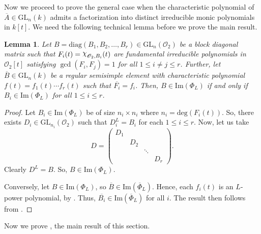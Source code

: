 \documentclass[11pt,twoside]{amsart}
\newcommand{\GL}{\mathrm{GL}}
\newcommand{\im}{\mathrm{Im}}
\newcommand{\upchi}{\raisebox{0.4ex}{$\chi$}}
\newcommand{\Char}{\upchi}
\newcommand{\R}{\mathscr{O}_2}
\newtheorem{lemma}{Lemma}[section]
\theoremstyle{definition} %
\begin{document}
Now we proceed to prove the general case when the characteristic polynomial of $\overline{A}\in \GL_n(k)$ admits a factorization into distinct irreducible monic polynomials in $k[t]$. We need the following technical lemma before we prove the main result.  
\begin{lemma}\label{lem:tech-2-thm-1}
Let $B= \mathrm{diag}(B_1, B_2, \ldots, B_r)\in \GL_n(\R)$ be a block diagonal matrix such that $F_i(t) = \Char_{\R, B_i}(t)$ are fundamental irreducible polynomials in $\R[t]$ satisfying $\gcd(F_i, F_j)=1$ for all $1\leq i\neq j\leq r$. Further, let $\overline{B} \in\GL_n(k)$ be a regular semisimple element with characteristic polynomial $f(t) = {f}_1(t)\cdots {f}_r(t)$ such that $\overline{F_i}= f_i$.
Then, $B\in \im(\Phi_L)$ if and only if $B_i\in \im(\Phi_L)$ for all $1\leq i\leq r$.
\end{lemma}
\begin{proof}
Let $B_i\in \im(\Phi_L)$ be of size $n_i\times n_i$ where $n_i = \mathrm{deg}(F_i(t))$. So, there exists $D_i\in \GL_{n_i}(\R)$ such that $D_i^L = B_i$ for each $1\leq i\leq r$. Now, let us take 
$$ D = \begin{pmatrix}  %
D_1 & & & \\& D_2 & & \\ & & \ddots & \\ & & & D_r
\end{pmatrix}.$$
Clearly $D^L = B$. So, $B\in \im(\Phi_L)$.

Conversely, let $B\in \im(\Phi_L)$, so $\overline{B} \in \im(\overline{\Phi}_L)$. Hence, each $f_i(t)$ is an $L$-power polynomial, by \cite[Proposition 4.5]{KunduSinghGL}. Thus, $\overline{B_i} \in \im(\overline{\Phi}_L)$ for all $i$. The result then follows from .
\end{proof}
\noindent Now we prove , the main result of this section.
\theoremone*
\end{document}
